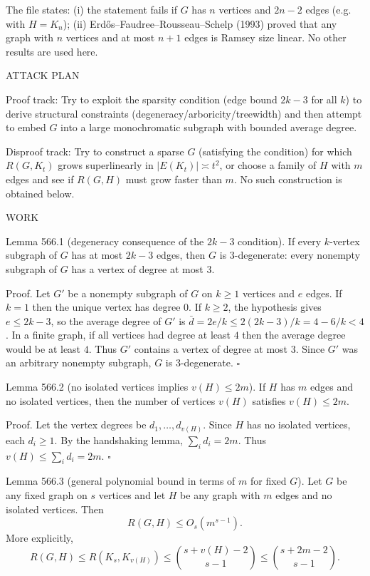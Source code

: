 The file states:
(i) the statement fails if $G$ has $n$ vertices and $2n-2$ edges (e.g. with $H=K_n$);
(ii) Erd\H{o}s--Faudree--Rousseau--Schelp (1993) proved that any graph with $n$ vertices and at most $n+1$ edges is Ramsey size linear.
No other results are used here.

ATTACK PLAN

Proof track:
Try to exploit the sparsity condition (edge bound $2k-3$ for all $k$) to derive structural constraints (degeneracy/arboricity/treewidth) and then attempt to embed $G$ into a large monochromatic subgraph with bounded average degree.

Disproof track:
Try to construct a sparse $G$ (satisfying the condition) for which $R(G,K_t)$ grows superlinearly in $|E(K_t)|\asymp t^2$, or choose a family of $H$ with $m$ edges and see if $R(G,H)$ must grow faster than $m$.
No such construction is obtained below.

WORK

Lemma 566.1 (degeneracy consequence of the $2k-3$ condition).
If every $k$-vertex subgraph of $G$ has at most $2k-3$ edges, then $G$ is $3$-degenerate: every nonempty subgraph of $G$ has a vertex of degree at most $3$.

Proof.
Let $G'$ be a nonempty subgraph of $G$ on $k\ge 1$ vertices and $e$ edges.
If $k=1$ then the unique vertex has degree $0$.
If $k\ge 2$, the hypothesis gives $e\le 2k-3$, so the average degree of $G'$ is
$\bar d = 2e/k \le 2(2k-3)/k = 4 - 6/k < 4$.
In a finite graph, if all vertices had degree at least $4$ then the average degree would be at least $4$.
Thus $G'$ contains a vertex of degree at most $3$.
Since $G'$ was an arbitrary nonempty subgraph, $G$ is $3$-degenerate. \hfill$\square$

Lemma 566.2 (no isolated vertices implies $v(H)\le 2m$).
If $H$ has $m$ edges and no isolated vertices, then the number of vertices $v(H)$ satisfies $v(H)\le 2m$.

Proof.
Let the vertex degrees be $d_1,\dots,d_{v(H)}$.
Since $H$ has no isolated vertices, each $d_i\ge 1$.
By the handshaking lemma, $\sum_i d_i = 2m$.
Thus $v(H)\le\sum_i d_i = 2m$. \hfill$\square$

Lemma 566.3 (general polynomial bound in terms of $m$ for fixed $G$).
Let $G$ be any fixed graph on $s$ vertices and let $H$ be any graph with $m$ edges and no isolated vertices.
Then
\[
R(G,H) \le O_s(m^{s-1}).
\]
More explicitly,
\[
R(G,H) \le R(K_s, K_{v(H)}) \le \binom{s+v(H)-2}{s-1} \le \binom{s+2m-2}{s-1}.
\]


